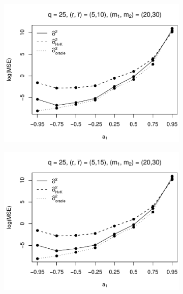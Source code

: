 \begin{figure}[p]
\begin{subfigure}[b]{0.45\textwidth}
\includegraphics[width=\textwidth]{Plots/Plots_Supplement/MSE_lrv_T=500_slope=10_(L1,L2,K1,K2,M1,M2)=(25,25,5,10,20,30).pdf}
\end{subfigure}
\hspace{0.25cm}
\begin{subfigure}[b]{0.45\textwidth}
\includegraphics[width=\textwidth]{Plots/Plots_Supplement/MSE_lrv_T=500_slope=10_(L1,L2,K1,K2,M1,M2)=(25,25,5,15,20,30).pdf}
\end{subfigure}


\end{figure}
